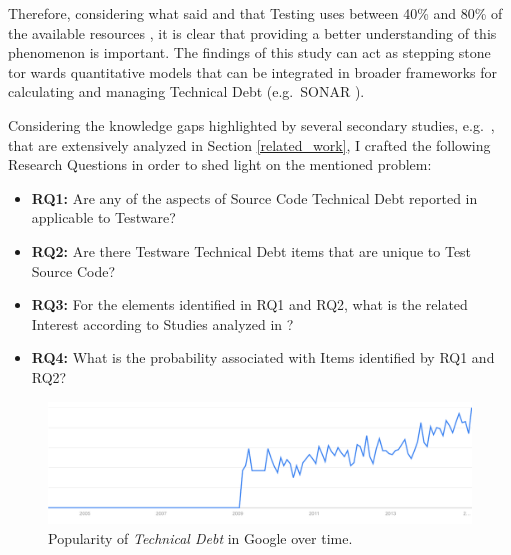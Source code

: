Therefore, considering what said and that Testing uses between 40\% and 80\% of the available resources \cite{exploratorying_testing_td}, it is clear that providing a better understanding of this phenomenon is important. The findings of this study can act as stepping stone tor wards quantitative models that can be integrated in broader frameworks for calculating and managing Technical Debt (e.g.\ SONAR \cite{sonar_evaluate_td}).

Considering the knowledge gaps highlighted by several secondary studies, e.g.\ \cite{mapping_study_td, exploration_of_td, exploration_of_td2}, that are extensively analyzed in Section \ref{related_work}, I crafted the following Research Questions in order to shed light on the mentioned problem:

\begin{itemize}
    \itemsep0em 
    
    \item \textbf{RQ1:} Are any of the aspects of Source Code Technical Debt reported in \cite{mapping_study_td} applicable to Testware?
    
    \item \textbf{RQ2:} Are there Testware Technical Debt items that are unique to Test Source Code?
    
    \item \textbf{RQ3:} For the elements identified in RQ1 and RQ2, what is the related Interest according to Studies analyzed in \cite{mapping_study_td}?
    
    \item \textbf{RQ4:} What is the probability associated with Items identified by RQ1 and RQ2?
    
\end{itemize}


\begin{figure}[h]
    \centering
    \includegraphics[width=\textwidth]{figure/technicalDebt.pdf}
    \caption{Popularity of \textit{Technical Debt} in Google over time.}
    \label{fig:technical_debt_trend}
\end{figure}

